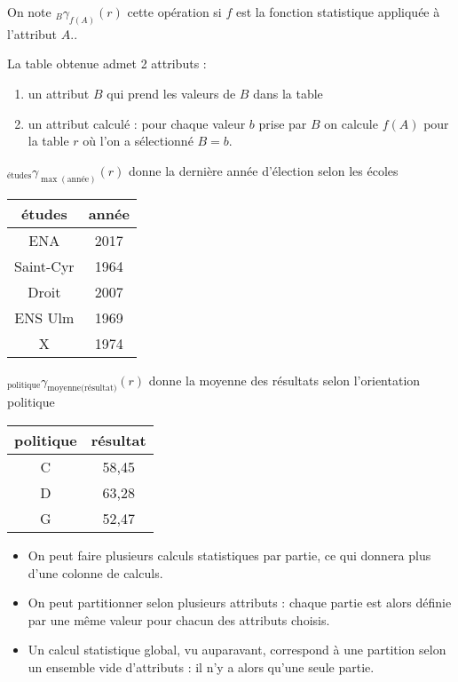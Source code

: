 On note ${}_B \gamma_{f(A)}(r)$ cette opération si $f$ est la fonction statistique appliquée à l'attribut $A$..

La table obtenue admet 2 attributs :
\begin{enumerate}
\item un attribut $B$ qui prend les valeurs de $B$ dans la table
\item un attribut calculé : pour chaque valeur $b$ prise par $B$ on calcule $f(A)$ pour la table $r$ où l'on a sélectionné $B=b$.
\end{enumerate}
${}_{\text{études}}\gamma_{\max(\text{année})}(r)$ donne la dernière année d'élection selon les écoles
\begin{center}
\begin{tabular}{|c|c|}
\hline
{\bf études}&{\bf année}\\
  \hline
  ENA&2017\\
  Saint-Cyr&1964\\
  Droit&2007\\
  ENS Ulm& 1969\\
  X&1974\\
\hline
\end{tabular}
\end{center}
${}_{\text{politique}}\gamma_{\text{moyenne(résultat)}}(r)$ donne la moyenne des résultats selon l'orientation politique
\begin{center}
\begin{tabular}{|c|c|}
\hline
{\bf politique}&{\bf résultat}\\
  \hline
C&58,45\\
D& 63,28\\
G&52,47\\
\hline
\end{tabular}
\end{center}
\begin{itemize}
\item On peut faire plusieurs calculs statistiques par partie, ce qui donnera plus d'une colonne de calculs.
\item On peut partitionner selon plusieurs attributs : chaque partie est alors définie par une même valeur pour chacun des attributs choisis.
\item Un calcul statistique global, vu auparavant, correspond à une partition selon un ensemble vide d'attributs : il n'y a alors qu'une seule partie.
\end{itemize}
\newpage
